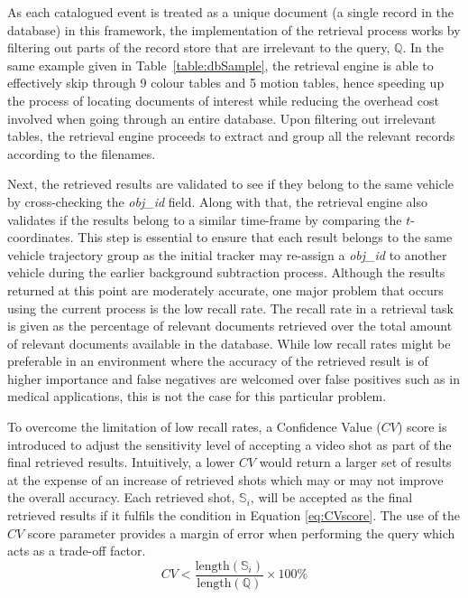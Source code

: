 As each catalogued event is treated as a unique document (a single record in the database) in this framework, the implementation of the retrieval process works by filtering out parts of the record store
that are irrelevant to the query, $\mathbb{Q}$. In the same example given in Table~\ref{table:dbSample}, the retrieval engine is able to effectively
skip through 9 colour tables and 5 motion tables, hence speeding up the process of locating documents of interest while reducing the overhead cost involved when going through an entire database. Upon filtering out irrelevant tables,
the retrieval engine proceeds to extract and group all the relevant records according to the filenames.

Next, the retrieved results are validated to see if they belong to the same vehicle by cross-checking the \emph{obj\_id} field. Along with that, the retrieval engine also validates if the results belong to a similar time-frame by comparing the $t$-coordinates. This step is essential to ensure that each result belongs to the same vehicle trajectory group as the initial tracker may re-assign a \emph{obj\_id} to another vehicle during the earlier background subtraction process. Although the results returned at this point are moderately accurate, one major problem that occurs using the current process is the low recall rate. The recall rate in a retrieval task is given as the percentage of relevant
documents retrieved over the total amount of relevant documents available in the database. While low recall rates might be preferable in an environment where the accuracy of the retrieved result is of higher importance and false negatives are welcomed over false positives such as in medical applications, this
is not the case for this particular problem.

To overcome the limitation of low recall rates, a Confidence Value ($CV$) score is introduced to adjust the sensitivity level of accepting a video shot as part of the final retrieved results. Intuitively, a lower $CV$ would return a larger set of results at the expense of an increase of retrieved shots which may or may not improve the overall accuracy. Each retrieved shot, $\mathbb{S}_i$, will be accepted as the final retrieved results if it fulfils
the condition in Equation \ref{eq:CVscore}. The use of the $CV$ score parameter provides a margin of error when performing the query which acts as a trade-off factor.
\begin{equation}
\label{eq:CVscore}
CV < \frac{\text{length}(\mathbb{S}_i)}{\text{length}(\mathbb{Q})} \times 100\%
\end{equation}

